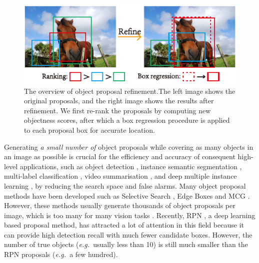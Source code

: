 \documentclass[10pt,twocolumn,letterpaper]{article}
\def\eg{\emph{e.g.~}}
\newcommand{\todo}[1]{{\textcolor{red}{#1}}}
\begin{document}
\begin{figure}[!t]
	\centering
    \includegraphics[width=\linewidth]{box_refinement}
    \caption{The overview of object proposal refinement.The left image shows the
    	original proposals, and the right image shows the results after refinement.
        We first re-rank the proposals by computing new objectness scores, after
        which a box regression procedure is applied to each proposal box for
        accurate location.}
    \label{fig:refinement_overview}
    \vspace{-0.2in}
\end{figure}


%
Generating \emph{a small number of} object proposals while covering as
many objects in an image as possible is crucial for the efficiency
and accuracy of consequent high-level applications, such as 
object detection \cite{girshick2014rich,girshick2015fast},
instance semantic segmentation \cite{he2017mask,arnab2017pixelwise},
multi-label classification \cite{wei2016hcp},
video summarisation \cite{lee2015predicting},
and deep multiple instance learning \cite{wu2015deep},
by reducing the search space and false alarms.
%
Many object proposal methods have been developed such as Selective 
Search \cite{uijlings2013selective}, Edge Boxes \cite{zitnick2014edge}
and MCG \cite{arbelaez2014multiscale}.
However, these methods usually generate thousands of object proposals
per image, which is too many for many vision tasks
\cite{wei2016hcp,wu2015deep,qi2016augmented,li2016weakly}.
%
Recently, RPN \cite{ren2015faster}, a deep learning based proposal
method, has attracted a lot of attention in this field because it
can provide high detection recall with much fewer candidate boxes.
However, the number of true objects (\eg usually less than 10)
is still much smaller than the RPN proposals (\eg a few hundred).
\end{document}
